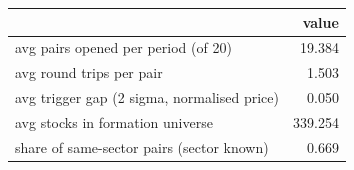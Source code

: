 \begin{tabular}{lr}
\toprule
 & value \\
\midrule
avg pairs opened per period (of 20) & 19.384 \\
avg round trips per pair & 1.503 \\
avg trigger gap (2 sigma, normalised price) & 0.050 \\
avg stocks in formation universe & 339.254 \\
share of same-sector pairs (sector known) & 0.669 \\
\bottomrule
\end{tabular}
